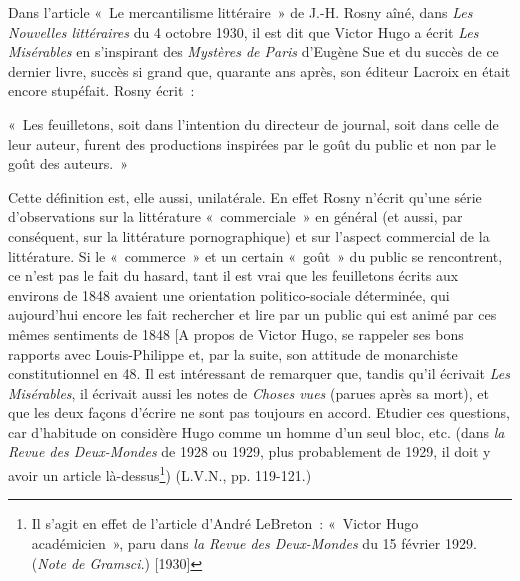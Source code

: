 \documentclass[french,twoside]{book} %
\newenvironment{quoteblock}%
  {\begin{quoting}}
  {\end{quoting}}
\newenvironment{quotebar}{%
    \def\FrameCommand{{\color{rubric!10!}\vrule width 0.5em} \hspace{0.9em}}%
    \def\OuterFrameSep{\itemsep} %
    \MakeFramed {\advance\hsize-\width \FrameRestore}
  }%
  {%
    \endMakeFramed
  }
\renewenvironment{quoteblock}%
  {%
    \savenotes
    \setstretch{0.9}
    \normalfont
    \begin{quotebar}
  }
  {%
    \end{quotebar}
    \spewnotes
  }
\begin{document}
{\raggedleft \noindent [1933-1934]\par}
\noindent Dans l’article « Le mercantilisme littéraire » de J.-H. Rosny aîné, dans \emph{Les Nouvelles littéraires} du 4 octobre 1930, il est dit que Victor Hugo a écrit \emph{Les Misérables} en s’inspirant des \emph{Mystères de Paris} d’Eugène Sue et du succès de ce dernier livre, succès si grand que, quarante ans après, son éditeur Lacroix en était encore stupéfait. Rosny écrit :\par

\begin{quoteblock}
 \noindent « Les feuilletons, soit dans l’intention du directeur de journal, soit dans celle de leur auteur, furent des productions inspirées par le goût du public et non par le goût des auteurs. »
\end{quoteblock}

\noindent Cette définition est, elle aussi, unilatérale. En effet Rosny n’écrit qu’une série d’observations sur la littérature « commerciale » en général (et aussi, par conséquent, sur la littérature pornographique) et sur l’aspect commercial de la littérature. Si le « commerce » et un certain « goût » du public se rencontrent, ce n’est pas le fait du hasard, tant il est vrai que les feuilletons écrits aux environs de 1848 avaient une orientation politico-sociale déterminée, qui aujourd’hui encore les fait rechercher et lire par un public qui est animé par ces mêmes sentiments de 1848 [A propos de Victor Hugo, se rappeler ses bons rapports avec Louis-Philippe et, par la suite, son attitude de monarchiste constitutionnel en 48. Il est intéressant de remarquer que, tandis qu’il écrivait \emph{Les Misérables}, il écrivait aussi les notes de \emph{Choses vues} (parues après sa mort), et que les deux façons d’écrire ne sont pas toujours en accord. Etudier ces questions, car d’habitude on considère Hugo comme un homme d’un seul bloc, etc. (dans \emph{la Revue des Deux-Mondes} de 1928 ou 1929, plus probablement de 1929, il doit y avoir un article là-dessus\footnote{Il s’agit en effet de l’article d’André LeBreton : « Victor Hugo académicien », paru dans \emph{la Revue des Deux-Mondes} du 15 février 1929. (\emph{Note de Gramsci}.) [1930]}) (L.V.N., pp. 119-121.)\par
{\raggedleft \noindent [1933-1934]}
\end{document}
